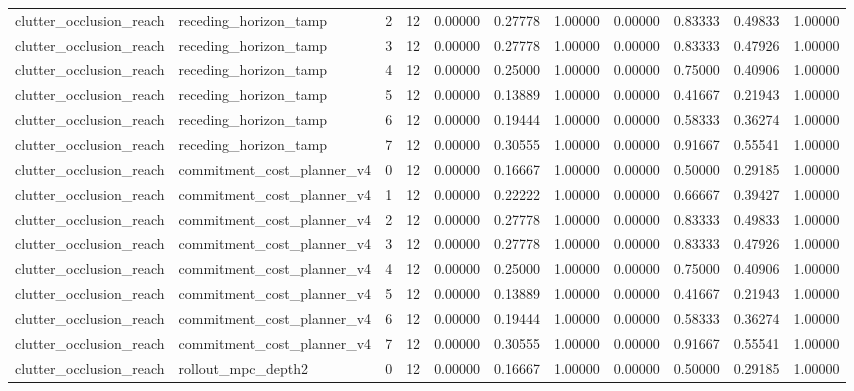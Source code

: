 \documentclass{article}
\begin{document}
\begin{table}[tbp]
{\begin{tabular}{lllllllllll}
clutter\_occlusion\_reach & receding\_horizon\_tamp & 2 & 12 & 0.00000 & 0.27778 & 1.00000 & 0.00000 & 0.83333 & 0.49833 & 1.00000 \\
clutter\_occlusion\_reach & receding\_horizon\_tamp & 3 & 12 & 0.00000 & 0.27778 & 1.00000 & 0.00000 & 0.83333 & 0.47926 & 1.00000 \\
clutter\_occlusion\_reach & receding\_horizon\_tamp & 4 & 12 & 0.00000 & 0.25000 & 1.00000 & 0.00000 & 0.75000 & 0.40906 & 1.00000 \\
clutter\_occlusion\_reach & receding\_horizon\_tamp & 5 & 12 & 0.00000 & 0.13889 & 1.00000 & 0.00000 & 0.41667 & 0.21943 & 1.00000 \\
clutter\_occlusion\_reach & receding\_horizon\_tamp & 6 & 12 & 0.00000 & 0.19444 & 1.00000 & 0.00000 & 0.58333 & 0.36274 & 1.00000 \\
clutter\_occlusion\_reach & receding\_horizon\_tamp & 7 & 12 & 0.00000 & 0.30555 & 1.00000 & 0.00000 & 0.91667 & 0.55541 & 1.00000 \\
clutter\_occlusion\_reach & commitment\_cost\_planner\_v4 & 0 & 12 & 0.00000 & 0.16667 & 1.00000 & 0.00000 & 0.50000 & 0.29185 & 1.00000 \\
clutter\_occlusion\_reach & commitment\_cost\_planner\_v4 & 1 & 12 & 0.00000 & 0.22222 & 1.00000 & 0.00000 & 0.66667 & 0.39427 & 1.00000 \\
clutter\_occlusion\_reach & commitment\_cost\_planner\_v4 & 2 & 12 & 0.00000 & 0.27778 & 1.00000 & 0.00000 & 0.83333 & 0.49833 & 1.00000 \\
clutter\_occlusion\_reach & commitment\_cost\_planner\_v4 & 3 & 12 & 0.00000 & 0.27778 & 1.00000 & 0.00000 & 0.83333 & 0.47926 & 1.00000 \\
clutter\_occlusion\_reach & commitment\_cost\_planner\_v4 & 4 & 12 & 0.00000 & 0.25000 & 1.00000 & 0.00000 & 0.75000 & 0.40906 & 1.00000 \\
clutter\_occlusion\_reach & commitment\_cost\_planner\_v4 & 5 & 12 & 0.00000 & 0.13889 & 1.00000 & 0.00000 & 0.41667 & 0.21943 & 1.00000 \\
clutter\_occlusion\_reach & commitment\_cost\_planner\_v4 & 6 & 12 & 0.00000 & 0.19444 & 1.00000 & 0.00000 & 0.58333 & 0.36274 & 1.00000 \\
clutter\_occlusion\_reach & commitment\_cost\_planner\_v4 & 7 & 12 & 0.00000 & 0.30555 & 1.00000 & 0.00000 & 0.91667 & 0.55541 & 1.00000 \\
clutter\_occlusion\_reach & rollout\_mpc\_depth2 & 0 & 12 & 0.00000 & 0.16667 & 1.00000 & 0.00000 & 0.50000 & 0.29185 & 1.00000 \\

\end{tabular}}
\end{table}
\end{document}
